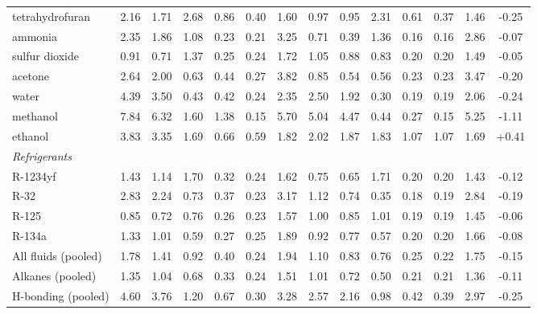 \begin{table}[H]
\begin{tabular}{lccccccccccccc}
tetrahydrofuran & 2.16 & 1.71 & 2.68 & 0.86 & 0.40 & 1.60 & 0.97 & 0.95 & 2.31 & 0.61 & 0.37 & 1.46 & -0.25 \\
ammonia & 2.35 & 1.86 & 1.08 & 0.23 & 0.21 & 3.25 & 0.71 & 0.39 & 1.36 & 0.16 & 0.16 & 2.86 & -0.07 \\
sulfur dioxide & 0.91 & 0.71 & 1.37 & 0.25 & 0.24 & 1.72 & 1.05 & 0.88 & 0.83 & 0.20 & 0.20 & 1.49 & -0.05 \\
acetone & 2.64 & 2.00 & 0.63 & 0.44 & 0.27 & 3.82 & 0.85 & 0.54 & 0.56 & 0.23 & 0.23 & 3.47 & -0.20 \\
water & 4.39 & 3.50 & 0.43 & 0.42 & 0.24 & 2.35 & 2.50 & 1.92 & 0.30 & 0.19 & 0.19 & 2.06 & -0.24 \\
methanol & 7.84 & 6.32 & 1.60 & 1.38 & 0.15 & 5.70 & 5.04 & 4.47 & 0.44 & 0.27 & 0.15 & 5.25 & -1.11 \\
ethanol & 3.83 & 3.35 & 1.69 & 0.66 & 0.59 & 1.82 & 2.02 & 1.87 & 1.83 & 1.07 & 1.07 & 1.69 & +0.41 \\
\multicolumn{14}{l}{\emph{Refrigerants}} \\
R-1234yf & 1.43 & 1.14 & 1.70 & 0.32 & 0.24 & 1.62 & 0.75 & 0.65 & 1.71 & 0.20 & 0.20 & 1.43 & -0.12 \\
R-32 & 2.83 & 2.24 & 0.73 & 0.37 & 0.23 & 3.17 & 1.12 & 0.74 & 0.35 & 0.18 & 0.19 & 2.84 & -0.19 \\
R-125 & 0.85 & 0.72 & 0.76 & 0.26 & 0.23 & 1.57 & 1.00 & 0.85 & 1.01 & 0.19 & 0.19 & 1.45 & -0.06 \\
R-134a & 1.33 & 1.01 & 0.59 & 0.27 & 0.25 & 1.89 & 0.92 & 0.77 & 0.57 & 0.20 & 0.20 & 1.66 & -0.08 \\
\midrule
All fluids (pooled) & 1.78 & 1.41 & 0.92 & 0.40 & 0.24 & 1.94 & 1.10 & 0.83 & 0.76 & 0.25 & 0.22 & 1.75 & -0.15 \\
Alkanes (pooled) & 1.35 & 1.04 & 0.68 & 0.33 & 0.24 & 1.51 & 1.01 & 0.72 & 0.50 & 0.21 & 0.21 & 1.36 & -0.11 \\
H-bonding (pooled) & 4.60 & 3.76 & 1.20 & 0.67 & 0.30 & 3.28 & 2.57 & 2.16 & 0.98 & 0.42 & 0.39 & 2.97 & -0.25 \\
\bottomrule
\end{tabular}
\end{table}
